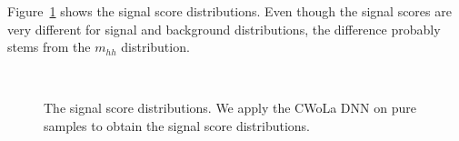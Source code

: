 \documentclass[12pt]{article}
\begin{document}
        Figure~\ref{fig:signal_score_distribution} shows the signal score distributions. Even though the signal scores are very different for signal and background distributions, the difference probably stems from the $m_{hh}$ distribution.
        \begin{figure}[htpb]
            \centering
            \\
            \caption{The signal score distributions. We apply the CWoLa DNN on pure samples to obtain the signal score distributions.}
            \label{fig:signal_score_distribution}
        \end{figure}
\end{document}
